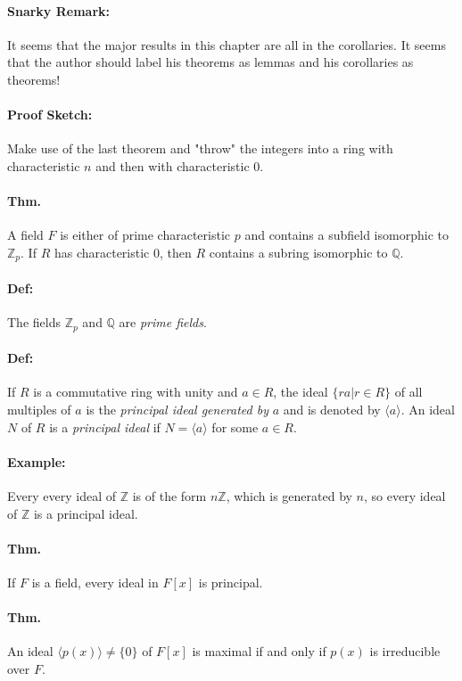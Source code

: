 \documentclass[10pt,a4paper]{article}
\begin{document}
\paragraph{Snarky Remark:} It seems that the major results in this chapter are all in the corollaries. It seems that the author should label his theorems as lemmas and his corollaries as theorems!

\paragraph{Proof Sketch:} Make use of the last theorem and "throw" the integers into a ring with characteristic $n$ and then with characteristic 0. 

\paragraph{Thm.} A field $F$ is either of prime characteristic $p$ and contains a subfield isomorphic to $\mathbb{Z}_p$. If $R$ has characteristic 0, then $R$ contains a subring isomorphic to $\mathbb{Q}$.

\paragraph{Def:} The fields $\mathbb{Z}_p$ and $\mathbb{Q}$ are \textit{prime fields}.

\paragraph{Def:} If $R$ is a commutative ring with unity and $a \in R$, the ideal $\{ ra | r \in R\}$ of all multiples of $a$ is the \textit{principal ideal generated by} $a$ and is denoted by $\langle a \rangle$. An ideal $N$ of $R$ is a \textit{principal ideal} if $N = \langle a \rangle$ for some $a \in R$.

\paragraph{Example:} Every every ideal of $\mathbb{Z}$ is of the form $n\mathbb{Z}$, which is generated by $n$, so every ideal of $\mathbb{Z}$ is a principal ideal.

\paragraph{Thm.} If $F$ is a field, every ideal in $F[x]$ is principal.

\paragraph{Thm.} An ideal $\langle p(x) \rangle \neq \{0\}$ of $F[x]$ is maximal if and only if $p(x)$ is irreducible over $F$.
\end{document}
